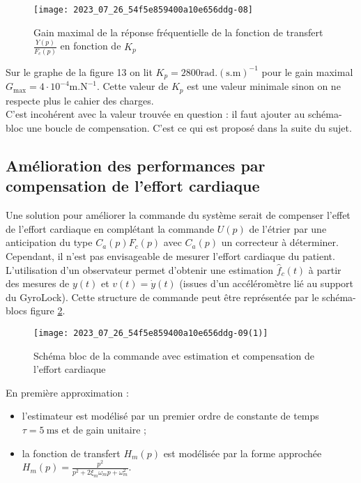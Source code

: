\begin{figure}[!h]
\centering
\texttt{[image: 2023\_07\_26\_54f5e859400a10e656ddg-08]}
\caption{\label{fig_ccspsi2022:13}Gain maximal de la réponse fréquentielle de la fonction de transfert $\frac{Y(p)}{F_{c}(p)}$ en fonction de $K_{p}$}
\end{figure}
\fi

\ifprof
\begin{corrige}
Sur le graphe de la figure 13 on lit $K_p = 2800 \text{rad}.(\text{s.m})^{-1}$ pour le gain maximal $G_{\text{max}} = 4\cdot 10^{-4}\text{m}.\text{N}^{-1}$. Cette valeur de $K_p$ est une valeur minimale sinon on ne respecte plus le cahier des charges.\\

C'est incohérent avec la valeur trouvée en question \label{q:22}: il faut ajouter au schéma-bloc une boucle de compensation. C'est ce qui est proposé dans la suite du sujet.
\end{corrige}
\else
\fi


\subsection{\label{sec:III.C} Amélioration des performances par compensation de l'effort cardiaque}
\ifprof
\else
Une solution pour améliorer la commande du système serait de compenser l'effet de l'effort cardiaque en complétant la commande $U(p)$ de l'étrier par une anticipation du type $C_{a}(p) F_{c}(p)$ avec $C_{a}(p)$ un correcteur à déterminer. Cependant, il n'est pas envisageable de mesurer l'effort cardiaque du patient. L'utilisation d'un observateur permet d'obtenir une estimation $\hat{f}_{c}(t)$ à partir des mesures de $y(t)$ et $v(t)=\dot{y}(t)$ (issues d'un accéléromètre lié au support du GyroLock). Cette structure de commande peut être représentée par le schéma-blocs figure \ref{fig_ccspsi2022:14}.

\begin{figure}[!h]
\centering
\texttt{[image: 2023\_07\_26\_54f5e859400a10e656ddg-09(1)]}
\caption{\label{fig_ccspsi2022:14}Schéma bloc de la commande avec estimation et compensation de l'effort cardiaque}
\end{figure}

En première approximation :
\begin{itemize}
\item l'estimateur est modélisé par un premier ordre de constante de temps $\tau=5 \mathrm{~ms}$ et de gain unitaire ;
  \item la fonction de transfert $H_{m}(p)$ est modélisée par la forme approchée $H_{m}(p)=\frac{p^{2}}{p^{2}+2 \xi_{m} \omega_{m} p+\omega_{m}^{2}}$.
\end{itemize}


